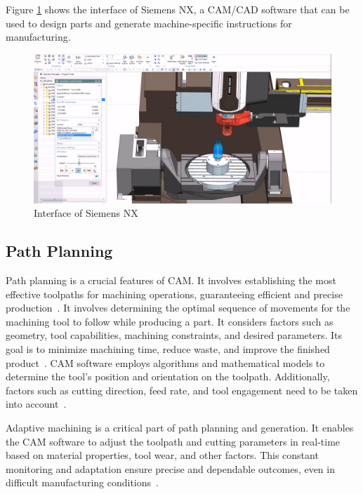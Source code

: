 
Figure \ref{CAMinterface} shows the interface of Siemens NX, a \acrshort{CAM}/\acrshort{CAD} software that can be used to design parts and generate machine-specific instructions for manufacturing. 

\begin{figure}[H]
	\centerline{\includegraphics[width=1\textwidth]{figures/CAM.png}}
	\caption{Interface of Siemens NX~\cite{NXManufacturing.2015}}
	\label{CAMinterface}
\end{figure}


\subsection{Path Planning}\label{papla}
Path planning is a crucial features of \acrshort{CAM}. It involves establishing the most effective toolpaths for machining operations, guaranteeing efficient and precise production~\cite{Brecher.2013}. It involves determining the optimal sequence of movements for the machining tool to follow while producing a part. It considers factors such as geometry, tool capabilities, machining constraints, and desired parameters. Its goal is to minimize machining time, reduce waste, and improve the finished product~\cite{Xu.2015}. \acrshort{CAM} software employs algorithms and mathematical models to determine the tool's position and orientation on the toolpath. Additionally, factors such as cutting direction, feed rate, and tool engagement need to be taken into account~\cite{Tunc.2017}.

Adaptive machining is a critical part of path planning and generation. It enables the \acrshort{CAM} software to adjust the toolpath and cutting parameters in real-time based on material properties, tool wear, and other factors. This constant monitoring and adaptation ensure precise and dependable outcomes, even in difficult manufacturing conditions~\cite{Liu.2017}.

